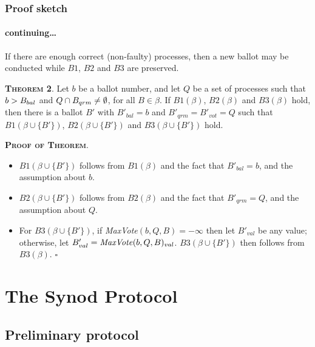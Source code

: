 \documentclass[10 pt]{beamer}
\begin{document}
\begin{frame}
\frametitle{Proof sketch}
\framesubtitle{continuing\ldots}

If there are enough correct (non-faulty) processes, then a new ballot may be conducted while $B1$, $B2$ and $B3$ are preserved.

\vspace{2 mm}
\textbf{\textsc{Theorem 2}}. Let $b$ be a ballot number, and let $Q$ be a set of processes such that $b > B_{bal}$ and $Q \cap B_{qrm} \neq \emptyset$, for all $B \in \beta$. If $B1(\beta)$, $B2(\beta)$ and $B3(\beta)$ hold, then there is a ballot $B'$ with $B'_{bal} = b$ and $B'_{qrm} = B'_{vot} = Q$ such that $B1(\beta \cup \{B'\})$, $B2(\beta \cup \{B'\})$ and $B3(\beta \cup \{B'\})$ hold.

\pause
\vspace{2 mm}
\textbf{\textsc{Proof of Theorem}}.
\begin{itemize}
\item $B1(\beta \cup \{B'\})$ follows from $B1(\beta)$ and the fact that $B'_{bal} = b$, and the assumption about $b$.
\item $B2(\beta \cup \{B'\})$ follows from $B2(\beta)$ and the fact that $B'_{qrm} = Q$, and the assumption about $Q$.
\item For $B3(\beta \cup \{B'\})$, if \textit{MaxVote}$(b,Q,B) = -\infty$ then let $B'_{val}$ be any value; otherwise, let $B'_{val} = \text{\textit{MaxVote}}(b,Q,B)_{val}$. $B3(\beta \cup \{B'\})$ then follows from $B3(\beta)$. $\square$
\end{itemize} 
\end{frame}



\section{The Synod Protocol}

\subsection{Preliminary protocol}
\end{document}
